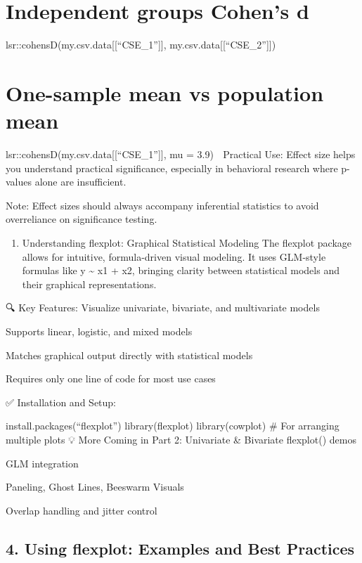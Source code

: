 \documentclass[
  letterpaper,
  DIV=11,
  numbers=noendperiod]{scrreprt}
\providecommand{\tightlist}{%
  \setlength{\itemsep}{0pt}\setlength{\parskip}{0pt}}
\begin{document}
{\chapter{Independent groups Cohen's
d}\label{independent-groups-cohens-d}

lsr::cohensD(my.csv.data{[}{[}``CSE\_1''{]}{]},
my.csv.data{[}{[}``CSE\_2''{]}{]})


\chapter{One-sample mean vs population
mean}\label{one-sample-mean-vs-population-mean}

lsr::cohensD(my.csv.data{[}{[}``CSE\_1''{]}{]}, mu = 3.9) 🧠 Practical
Use: Effect size helps you understand practical significance, especially
in behavioral research where p-values alone are insufficient.

Note: Effect sizes should always accompany inferential statistics to
avoid overreliance on significance testing.

\begin{enumerate}
\def\labelenumi{\arabic{enumi}.}
\setcounter{enumi}{2}
\tightlist
\item
  Understanding flexplot: Graphical Statistical Modeling The flexplot
  package allows for intuitive, formula-driven visual modeling. It uses
  GLM-style formulas like y \textasciitilde{} x1 + x2, bringing clarity
  between statistical models and their graphical representations.
\end{enumerate}

🔍 Key Features: Visualize univariate, bivariate, and multivariate
models

Supports linear, logistic, and mixed models

Matches graphical output directly with statistical models

Requires only one line of code for most use cases

✅ Installation and Setup:

install.packages(``flexplot'') library(flexplot) library(cowplot) \# For
arranging multiple plots 💡 More Coming in Part 2: Univariate \&
Bivariate flexplot() demos

GLM integration

Paneling, Ghost Lines, Beeswarm Visuals

Overlap handling and jitter control

\section{4. Using flexplot: Examples and Best
Practices}\label{using-flexplot-examples-and-best-practices}

}
\end{document}
